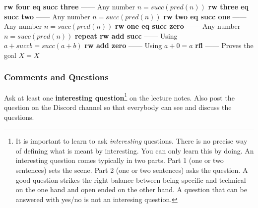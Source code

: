 \documentclass{article}
\theoremstyle{theorem}
\theoremstyle{definition}
\theoremstyle{remark}
\begin{document}
  \bgroup\obeylines
  \qquad \textbf{rw four eq succ three} —— Any number $n = succ(pred(n))$
  \qquad \textbf{rw three eq succ two}  —— Any number $n = succ(pred(n))$
  \qquad \textbf{rw two eq succ one}    —— Any number $n = succ(pred(n))$
  \qquad \textbf{rw one eq succ zero}   —— Any number $n = succ(pred(n))$
  \qquad \textbf{repeat rw add succ}    —— Using $a + succ b = succ (a + b)$
  \qquad \textbf{rw add zero}           —— Using $a + 0 = a$
  \qquad \textbf{rfl}                   —— Proves the goal $X = X$

  \egroup

%
%

\subsubsection*{Comments and Questions}



Ask at least one \textbf{interesting question}\footnote{It is important to learn to ask \emph{interesting} questions. There is no precise way of defining what is meant by interesting. You can only learn this by doing. An interesting question comes typically in two parts. Part 1 (one or two sentences) sets the scene. Part 2 (one or two sentences) asks the question. A good question strikes the right balance between being specific and technical on the one hand and open ended on the other hand. A question that can be answered with yes/no is not an interesing question.} on the lecture notes. Also post the question on the Discord channel so that everybody can see and discuss the questions.
\end{document}
